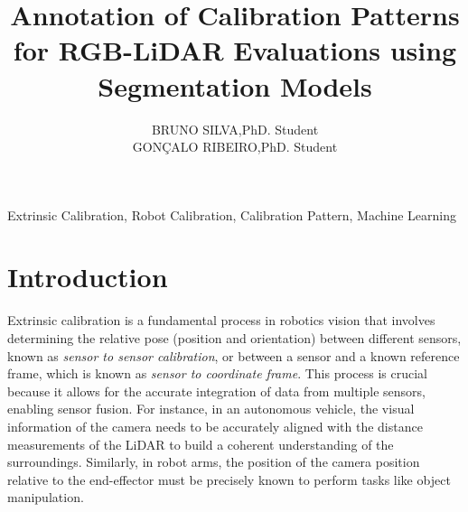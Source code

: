 \documentclass{ieeeaccess}
\begin{document}

\title{Annotation of Calibration Patterns for RGB-LiDAR Evaluations using Segmentation Models}
\author{\uppercase{Bruno Silva},PhD. Student\\
\uppercase{Gonçalo Ribeiro},PhD. Student}

\address[1]{Department of Mechanical Engineering, University of Aveiro}



\begin{abstract}
  \lipsum[1-2]
\end{abstract}

\begin{keywords}
Extrinsic Calibration, Robot Calibration, Calibration Pattern, Machine Learning
\end{keywords}

\titlepgskip=-21pt

\maketitle

\section{Introduction}
\label{sec:introduction}

Extrinsic calibration is a fundamental process in robotics vision that involves determining the
relative pose (position and orientation) between different sensors, known as \textit{sensor to sensor calibration}, or between a sensor and a known reference
frame, which is known as \textit{sensor to coordinate frame}. This process is crucial because it allows for the accurate integration of data from multiple sensors,
enabling sensor fusion. For instance, in an autonomous vehicle, the visual information of the camera
needs to be accurately aligned with the distance measurements of the LiDAR to build a coherent understanding of the
surroundings. Similarly, in robot arms, the position of the camera position relative to the end-effector must be precisely
known to perform tasks like object manipulation. 
\end{document}
